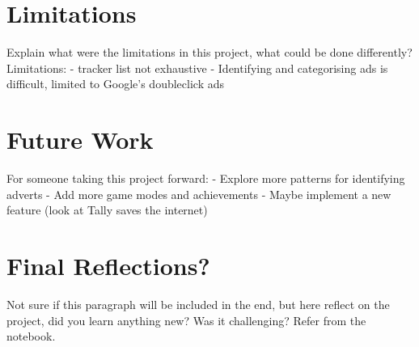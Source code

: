 \documentclass{l4proj}
\begin{document}
\section{Limitations}
Explain what were the limitations in this project, what could be done differently? 
Limitations:
 - tracker list not exhaustive
 - Identifying and categorising ads is difficult, limited to Google's doubleclick ads

\section{Future Work}
For someone taking this project forward:
 - Explore more patterns for identifying adverts
 - Add more game modes and achievements
 - Maybe implement a new feature (look at Tally saves the internet)

\section{Final Reflections?}
Not sure if this paragraph will be included in the end, but here reflect on the project, did you learn anything new? Was it challenging? Refer from the notebook.

%
% 
\end{document}
